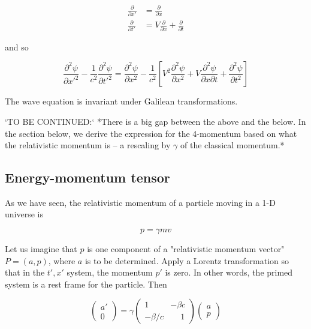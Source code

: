 \begin{align}
  \frac{\partial}{\partial x'} &=  \frac{\partial}{\partial x} \\
  \frac{\partial}{\partial t'} &= V \frac{\partial}{\partial x}
  + \frac{\partial}{\partial t}
\end{align}

and so

\begin{equation}
\frac{\partial^2 \psi}{\partial x'^2}
-
\frac{1}{c^2}
\frac{\partial^2 \psi}{\partial t'^2}
=
\frac{\partial^2 \psi}{\partial x^2}
-
\frac{1}{c^2} \left[
V^2 \frac{\partial^2 \psi}{\partial x^2}  +  V \frac{\partial^2 \psi}{\partial x \partial t}  +  \frac{\partial^2 \psi}{\partial t^2}
\right]
\end{equation}

The wave equation is  invariant under Galilean
transformations.


`TO BE CONTINUED:` *There is a big gap between the above and the below. In the section below, we derive the expression for the 4-momentum based on what the relativistic momentum is -- a rescaling by $\gamma$ of the classical momentum.*

\subsection{Energy-momentum tensor}





As we have seen, the relativistic momentum of a particle
moving in a 1-D universe is

\begin{equation}
  p = \gamma mv
\end{equation}

Let us imagine that $p$ is one component of a "relativistic
momentum vector" $P = (a, p)$, where $a$ is to be determined.
Apply a Lorentz transformation so that in the $t', x'$ system,  the momentum $p'$ is zero.  In other words, the primed system is a rest frame for the particle.  Then



\begin{equation}
\begin{pmatrix} a' \\ 0 \end{pmatrix}
=
\gamma \begin{pmatrix}
    1  & - \beta c  \\
  -\beta/c & \phantom{-}1
\end{pmatrix}
\begin{pmatrix} a \\ p \end{pmatrix}
\end{equation}

